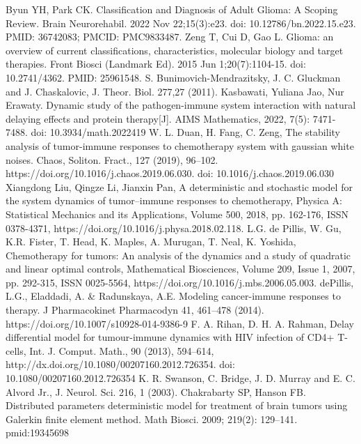 \documentclass[12pt,a4paper]{extarticle}
\theoremstyle{definition}
\theoremstyle{definition}
\theoremstyle{definition}
\begin{document}
	\begin{thebibliography}{6}
		Byun YH, Park CK. Classification and Diagnosis of Adult Glioma: A Scoping Review. Brain Neurorehabil. 2022 Nov 22;15(3):e23. doi: 10.12786/bn.2022.15.e23. PMID: 36742083; PMCID: PMC9833487.
		Zeng T, Cui D, Gao L. Glioma: an overview of current classifications, characteristics, molecular biology and target therapies. Front Biosci (Landmark Ed). 2015 Jun 1;20(7):1104-15. doi: 10.2741/4362. PMID: 25961548.
		S. Bunimovich-Mendrazitsky, J. C. Gluckman and J. Chaskalovic, J. Theor. Biol. 277,27 (2011).
		Kasbawati, Yuliana Jao, Nur Erawaty. Dynamic study of the pathogen-immune system interaction with natural delaying effects and protein therapy[J]. AIMS Mathematics, 2022, 7(5): 7471-7488. doi: 10.3934/math.2022419
		W. L. Duan, H. Fang, C. Zeng, The stability analysis of tumor-immune responses to chemotherapy system with gaussian white noises. Chaos, Soliton. Fract., 127 (2019), 96–102. https://doi.org/10.1016/j.chaos.2019.06.030. doi: 10.1016/j.chaos.2019.06.030 
		Xiangdong Liu, Qingze Li, Jianxin Pan, A deterministic and stochastic model for the system dynamics of tumor–immune responses to chemotherapy, Physica A: Statistical Mechanics and its Applications, Volume 500, 2018, pp. 162-176, ISSN 0378-4371, https://doi.org/10.1016/j.physa.2018.02.118.
		L.G. de Pillis, W. Gu, K.R. Fister, T. Head, K. Maples, A. Murugan, T. Neal, K. Yoshida, Chemotherapy for tumors: An analysis of the dynamics and a study of quadratic and linear optimal controls, Mathematical Biosciences, Volume 209, Issue 1, 2007, pp. 292-315, ISSN 0025-5564, https://doi.org/10.1016/j.mbs.2006.05.003.
		dePillis, L.G., Eladdadi, A. \& Radunskaya, A.E. Modeling cancer-immune responses to therapy. J Pharmacokinet Pharmacodyn 41, 461–478 (2014). https://doi.org/10.1007/s10928-014-9386-9
		F. A. Rihan, D. H. A. Rahman, Delay differential model for tumour-immune dynamics with HIV infection of CD4+ T-cells, Int. J. Comput. Math., 90 (2013), 594–614, http://dx.doi.org/10.1080/00207160.2012.726354. doi: 10.1080/00207160.2012.726354 
		K. R. Swanson, C. Bridge, J. D. Murray and E. C. Alvord Jr., J. Neurol. Sci. 216, 1 (2003).
		Chakrabarty SP, Hanson FB. Distributed parameters deterministic model for treatment of brain tumors using Galerkin finite element method. Math Biosci. 2009; 219(2): 129–141. pmid:19345698

\end{thebibliography}
\end{document}
